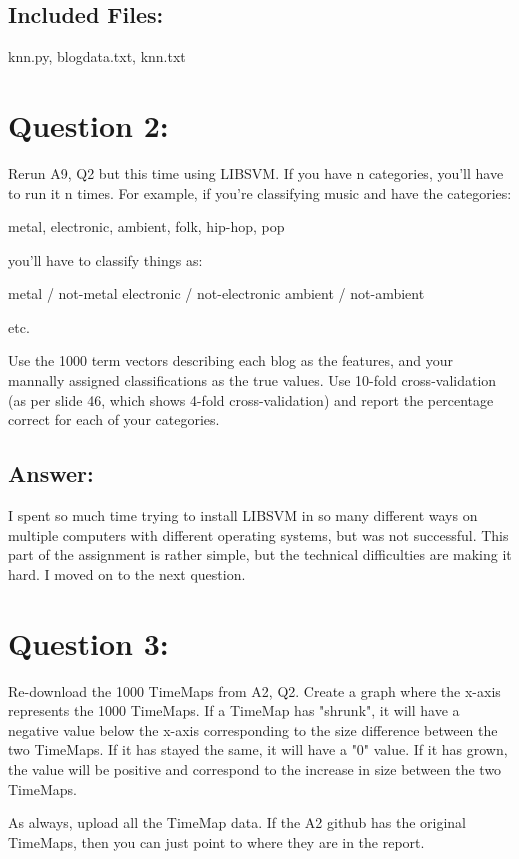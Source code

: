 \documentclass[a4paper, 11pt]{article}
\begin{document}
\subsection*{Included Files:}
knn.py, blogdata.txt, knn.txt

\section*{Question 2:}

Rerun A9, Q2 but this time using LIBSVM.  If you have n categories,
you'll have to run it n times.  For example, if you're classifying music
and have the categories:

metal, electronic, ambient, folk, hip-hop, pop

you'll have to classify things as:

metal / not-metal
electronic / not-electronic
ambient / not-ambient

etc.

Use the 1000 term vectors describing each blog as the features, and
your mannally assigned classifications as the true values.  Use
10-fold cross-validation (as per slide 46, which shows 4-fold
cross-validation) and report the percentage correct for 
each of your categories.

\subsection*{Answer:}

I spent so much time trying to install LIBSVM in so many different ways on multiple computers with different operating systems, but was not successful. This part of the assignment is rather simple, but the technical difficulties are making it hard. I moved on to the next question. 


\section*{Question 3:}

Re-download the 1000 TimeMaps from A2, Q2.  Create a graph where
the x-axis represents the 1000 TimeMaps.  If a TimeMap has "shrunk",
it will have a negative value below the x-axis corresponding to the
size difference between the two TimeMaps.  If it has stayed the
same, it will have a "0" value.  If it has grown, the value will be 
positive and correspond to the increase in size between the two
TimeMaps.

As always, upload all the TimeMap data.  If the A2 github has the 
original TimeMaps, then you can just point to where they are in 
the report.
\end{document}
